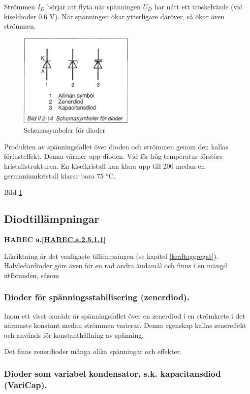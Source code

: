 Strömmen \(I_D\) börjar att flyta när spänningen \(U_D\) har nått ett
tröskelvärde (vid kiseldioder 0.6 V). När spänningen ökar ytterligare däröver,
så ökar även strömmen.

\begin{figure}
\includegraphics[width=0.5\textwidth]{images/bild_2_2-14}
\caption{Schemasymboler för dioder}
\label{fig:BildII2-14}
\end{figure}

Produkten av spänningsfallet över dioden och strömmen genom den kallas
förlusteffekt. Denna värmer upp dioden. Vid för hög temperatur förstörs
kristallstrukturen. En kiselkristall kan klara upp till 200 medan en
germaniumkristall klarar bara 75 °C.

Bild \ref{fig:BildII2-14}

\subsection{Diodtillämpningar}
\textbf{HAREC a.\ref{HAREC.a.2.5.1.1}\label{myHAREC.a.2.5.1.1}}

Likriktning är det vanligaste tillämpningen (se kapitel \ref{kraftaggregat}).
Halvledardioder görs även för en rad andra ändamål och finns i en mängd
utföranden, såsom

\subsubsection{Dioder för spänningsstabilisering (zenerdiod).}

  Inom ett visst område är spänningsfallet över en zenerdiod i en strömkrets
  i det närmaste konstant medan strömmen varierar. Denna egenskap kallas
  zenereffekt och används för konstanthållning av spänning.

  Det finns zenerdioder många olika spänningar och effekter.

\subsubsection{Dioder som variabel kondensator, s.k. kapacitansdiod (VariCap).}
\label{varicap}

